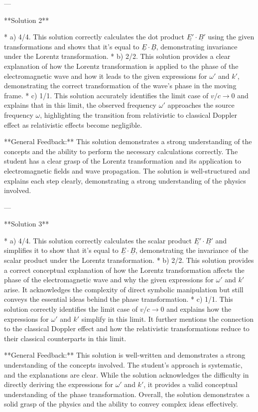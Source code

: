 \documentclass[a4paper,11pt]{article}
\begin{document}
---

**Solution 2**

* a) 4/4. This solution correctly calculates the dot product \( \underline{E'} \cdot \underline{B'} \) using the given transformations and shows that it's equal to \( \underline{E} \cdot \underline{B} \), demonstrating invariance under the Lorentz transformation.
* b) 2/2. This solution provides a clear explanation of how the Lorentz transformation is applied to the phase of the electromagnetic wave and how it leads to the given expressions for \( \omega' \) and \( k' \), demonstrating the correct transformation of the wave's phase in the moving frame.
* c) 1/1. This solution accurately identifies the limit case of \( v/c \rightarrow 0 \) and explains that in this limit, the observed frequency \( \omega' \) approaches the source frequency \( \omega \), highlighting the transition from relativistic to classical Doppler effect as relativistic effects become negligible.

**General Feedback:** This solution demonstrates a strong understanding of the concepts and the ability to perform the necessary calculations correctly. The student has a clear grasp of the Lorentz transformation and its application to electromagnetic fields and wave propagation. The solution is well-structured and explains each step clearly, demonstrating a strong understanding of the physics involved.

---

**Solution 3**

* a) 4/4. This solution correctly calculates the scalar product \( \underline{E'} \cdot \underline{B'} \) and simplifies it to show that it's equal to \( \underline{E} \cdot \underline{B} \), demonstrating the invariance of the scalar product under the Lorentz transformation.
* b) 2/2. This solution provides a correct conceptual explanation of how the Lorentz transformation affects the phase of the electromagnetic wave and why the given expressions for \( \omega' \) and \( k' \) arise. It acknowledges the complexity of direct symbolic manipulation but still conveys the essential ideas behind the phase transformation.
* c) 1/1. This solution correctly identifies the limit case of \( v/c \rightarrow 0 \) and explains how the expressions for \( \omega' \) and \( k' \) simplify in this limit. It further mentions the connection to the classical Doppler effect and how the relativistic transformations reduce to their classical counterparts in this limit.

**General Feedback:** This solution is well-written and demonstrates a strong understanding of the concepts involved. The student's approach is systematic, and the explanations are clear. While the solution acknowledges the difficulty in directly deriving the expressions for \( \omega' \) and \( k' \), it provides a valid conceptual understanding of the phase transformation. Overall, the solution demonstrates a solid grasp of the physics and the ability to convey complex ideas effectively.
\end{document}
